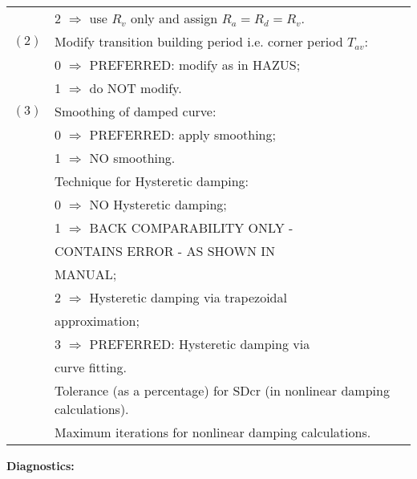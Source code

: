 \documentclass[a4paper, 12pt]{report}
\begin{document}
\begin{supertabular}{lp{0.6\textwidth}}
 & \hspace{0.5em} 2 $\Rightarrow$ use $R_v$ only and assign $R_a=R_d=R_v$. \\
$(2)$ & Modify transition building period i.e. corner period $T_{av}$: \\
 & \hspace{0.5em} 0 $\Rightarrow$ \small{PREFERRED}: modify as in HAZUS; \\
 & \hspace{0.5em} 1 $\Rightarrow$ do NOT modify. \\
$(3)$ & Smoothing of damped curve: \\
 & \hspace{0.5em} 0 $\Rightarrow$ \small{PREFERRED}: apply smoothing; \\
 & \hspace{0.5em} 1 $\Rightarrow$ NO smoothing.\\
 & Technique for Hysteretic  damping: \\
 & \hspace{0.5em} 0 $\Rightarrow$ NO Hysteretic  damping; \\
 & \hspace{0.5em} 1 $\Rightarrow$ \small{BACK COMPARABILITY ONLY - }  \\
& \hspace{2.8em} \small{CONTAINS ERROR - AS SHOWN IN} \\
& \hspace{2.8em} \small{MANUAL};\\
 & \hspace{0.5em} 2 $\Rightarrow$ Hysteretic  damping via trapezoidal \\
 & \hspace{2.8em} approximation; \\
 & \hspace{0.5em} 3 $\Rightarrow$ \small{PREFERRED}: Hysteretic  damping via \\
 & \hspace{2.8em} curve fitting. \\
    &    Tolerance (as a percentage) for SDcr (in nonlinear damping calculations).   \\
  & Maximum iterations for nonlinear damping calculations.\\
 \end{supertabular}

\vspace{2em} \noindent \textbf{Diagnostics:}
\end{document}
